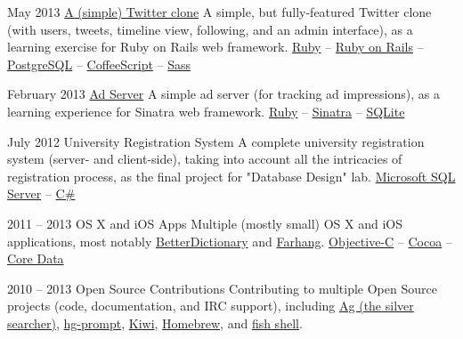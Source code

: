 \documentclass{tccv}
\begin{document}
{{\begin{project_list}
\item{May 2013}
	 {}
	 {\href{https://github.com/pooriaazimi/twitter}{A (simple) Twitter clone}}
	 {A simple, but fully-featured Twitter clone (with users, tweets, timeline view, following, and an admin interface), as a learning exercise for Ruby on Rails web framework.}
	 {
		 \href{https://www.ruby-lang.org/en/}{Ruby} -- 
		 \href{http://rubyonrails.org}{Ruby on Rails} -- 
		 \href{http://www.postgresql.org}{PostgreSQL} -- 
		 \href{http://coffeescript.org}{CoffeeScript} -- 
		 \href{http://sass-lang.com}{Sass}
	 }



\item{February 2013}
	 {}
	 {\href{https://github.com/pooriaazimi/adserver}{Ad Server}}
	 {A simple ad server (for tracking ad impressions), as a learning experience for Sinatra web framework.}
	 {
	 	\href{https://www.ruby-lang.org/en/}{Ruby} -- 
		\href{http://www.sinatrarb.com}{Sinatra} -- 
		\href{http://www.sqlite.org}{SQLite}
	 }



\item{July 2012}
	 {}
	 {University Registration System}
	 {A complete university registration system (server- and client-side), taking into account all the intricacies of registration process, as the final project for "Database Design" lab.}
	 {
	 	\href{http://www.microsoft.com/en-us/sqlserver/default.aspx}{Microsoft SQL Server} -- 
		\href{https://en.wikipedia.org/wiki/C_Sharp_(programming_language)}{C\#}
	 }
	 
	 
	 
\item{2011 -- 2013}
	 {}
	 {OS X and iOS Apps}
	 {Multiple (mostly small) OS X and iOS applications, most notably \href{http://pooriaazimi.github.io/BetterDictionary/}{BetterDictionary} and \href{http://www.turnedondigital.com/?portfolio=farhang-iphone-app}{Farhang}.}
	 {
	 	\href{https://en.wikipedia.org/wiki/Objective-C}{Objective-C} -- 
		\href{https://en.wikipedia.org/wiki/Cocoa_(API)}{Cocoa} -- 
		\href{https://en.wikipedia.org/wiki/Core_Data}{Core Data}
	 }
	 


\item{2010 -- 2013}
	 {}
	 {Open Source Contributions}
	 {Contributing to multiple Open Source projects (code, documentation, and IRC support), including 
	 \href{https://github.com/ggreer/the_silver_searcher}{Ag (the silver searcher)}, 
	 \href{http://bitbucket.org/sjl/hg-prompt/}{hg-prompt}, \href{https://github.com/allending/Kiwi}{Kiwi}, 
	 \href{https://github.com/mxcl/homebrew}{Homebrew}, and 
	 \href{http://fishshell.com}{fish shell}.}
	 {}



\end{project_list}}}
\end{document}
